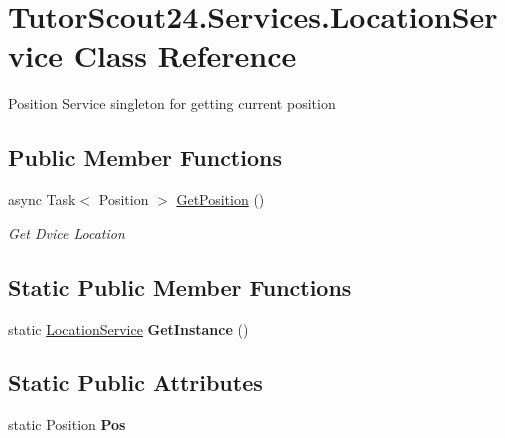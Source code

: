 \hypertarget{class_tutor_scout24_1_1_services_1_1_location_service}{}\section{Tutor\+Scout24.\+Services.\+Location\+Service Class Reference}
\label{class_tutor_scout24_1_1_services_1_1_location_service}


Position Service singleton for getting current position  


\subsection*{Public Member Functions}
\begin{DoxyCompactItemize}
\item 
async Task$<$ Position $>$ \mbox{\hyperlink{class_tutor_scout24_1_1_services_1_1_location_service_a688f8634878e6b756de29fda502c6f7f}{Get\+Position}} ()
\begin{DoxyCompactList}\small\item\em Get Dvice Location \end{DoxyCompactList}\end{DoxyCompactItemize}
\subsection*{Static Public Member Functions}
\begin{DoxyCompactItemize}
\item 
\mbox{\label{class_tutor_scout24_1_1_services_1_1_location_service_aea7d04c952deac51097f57e480193962}} 
static \mbox{\hyperlink{class_tutor_scout24_1_1_services_1_1_location_service}{Location\+Service}} {\bfseries Get\+Instance} ()
\end{DoxyCompactItemize}
\subsection*{Static Public Attributes}
\begin{DoxyCompactItemize}
\item 
\mbox{\label{class_tutor_scout24_1_1_services_1_1_location_service_ac901a43921aa103c092fe18f507cc2df}} 
static Position {\bfseries Pos}
\end{DoxyCompactItemize}


